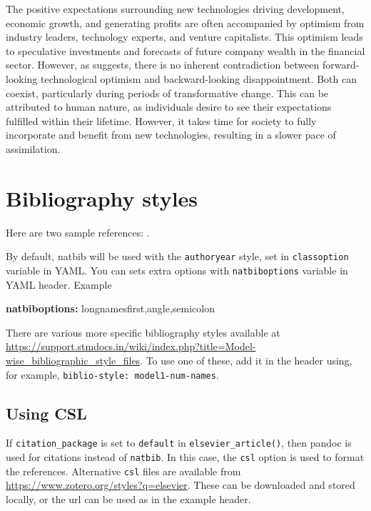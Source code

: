 \documentclass[preprint, 3p,
authoryear]{elsarticle} %
\newenvironment{Shaded}{\begin{snugshade}}{\end{snugshade}}
\newcommand{\AttributeTok}[1]{\textcolor[rgb]{0.13,0.29,0.53}{#1}}
\newcommand{\FunctionTok}[1]{\textcolor[rgb]{0.13,0.29,0.53}{\textbf{#1}}}
\newcommand{\KeywordTok}[1]{\textcolor[rgb]{0.13,0.29,0.53}{\textbf{#1}}}
\begin{document}
The positive expectations surrounding new technologies driving
development, economic growth, and generating profits are often
accompanied by optimism from industry leaders, technology experts, and
venture capitalists. This optimism leads to speculative investments and
forecasts of future company wealth in the financial sector. However, as
\citep{paradox} suggests, there is no inherent contradiction between
forward-looking technological optimism and backward-looking
disappointment. Both can coexist, particularly during periods of
transformative change. This can be attributed to human nature, as
individuals desire to see their expectations fulfilled within their
lifetime. However, it takes time for society to fully incorporate and
benefit from new technologies, resulting in a slower pace of
assimilation.

\hypertarget{bibliography-styles}{%
\section{Bibliography styles}\label{bibliography-styles}}

Here are two sample references: \citeauthor{Feynman1963118}
\citetext{\citeyear{Feynman1963118}; \citealp{Dirac1953888}}.

By default, natbib will be used with the \texttt{authoryear} style, set
in \texttt{classoption} variable in YAML. You can sets extra options
with \texttt{natbiboptions} variable in YAML header. Example

\begin{Shaded}
\begin{Highlighting}[]
\FunctionTok{natbiboptions}\KeywordTok{:}\AttributeTok{ longnamesfirst,angle,semicolon}
\end{Highlighting}
\end{Shaded}

There are various more specific bibliography styles available at
\url{https://support.stmdocs.in/wiki/index.php?title=Model-wise_bibliographic_style_files}.
To use one of these, add it in the header using, for example,
\texttt{biblio-style:\ model1-num-names}.

\hypertarget{using-csl}{%
\subsection{Using CSL}\label{using-csl}}

If \texttt{citation\_package} is set to \texttt{default} in
\texttt{elsevier\_article()}, then pandoc is used for citations instead
of \texttt{natbib}. In this case, the \texttt{csl} option is used to
format the references. Alternative \texttt{csl} files are available from
\url{https://www.zotero.org/styles?q=elsevier}. These can be downloaded
and stored locally, or the url can be used as in the example header.
\end{document}
